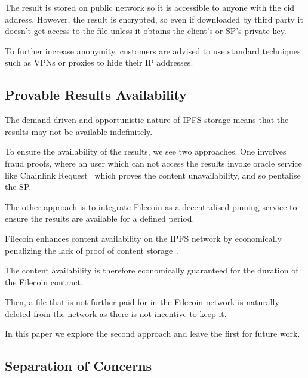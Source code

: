 \documentclass[pdftex,twocolumn,epjc3]{svjour3}
\begin{document}
The result is stored on public network so it is accessible to anyone with the cid address. However, the result is encrypted, so even if downloaded by third party it doesn't get access to the file unless it obtains the client's or SP's private key. 

To further increase anonymity, customers are advised to use standard techniques such as VPNs or proxies to hide their IP addresses.

\subsection{Provable Results Availability}

The demand-driven and opportunistic nature of IPFS storage means that the results may not be available indefinitely.

To ensure the availability of the results, we see two approaches. One involves fraud proofs, where an user which can not access the results invoke oracle service like Chainlink Request~\cite{breidenbachChainlinkNextSteps2021, ChainlinkMakeGET} which proves the content unavailability, and so pentalise the SP. 

The other approach is to integrate Filecoin as a decentralised pinning service to ensure the results are available for a defined period.

Filecoin enhances content availability on the IPFS network by economically penalizing the lack of proof of content storage~\cite{filecoinSlashing}.

The content availability is therefore economically guaranteed for the duration of the Filecoin contract.

Then, a file that is not further paid for in the Filecoin network is naturally deleted from the network as there is not incentive to keep it.

In this paper we explore the second approach and leave the first for future work.

\subsection{Separation of Concerns}\label{sec:separation-of-concerns}
\end{document}

